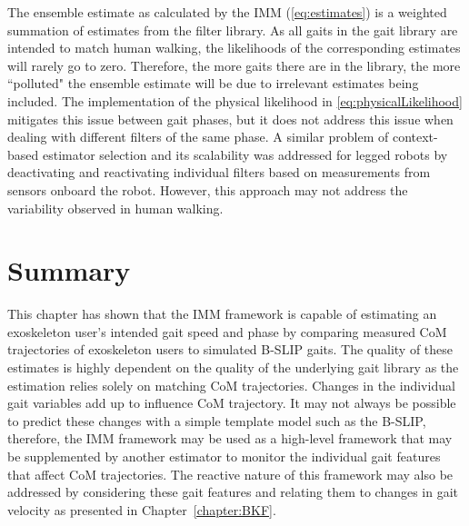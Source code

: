 The ensemble estimate as calculated by the IMM (\ref{eq:estimates}) is a weighted summation of estimates from the filter library. As all gaits in the gait library are intended to match human walking, the likelihoods of the corresponding estimates will rarely go to zero. Therefore, the more gaits there are in the library, the more ``polluted" the ensemble estimate will be due to irrelevant estimates being included. The implementation of the physical likelihood in \eqref{eq:physicalLikelihood} mitigates this issue between gait phases, but it does not address this issue when dealing with different filters of the same phase. A similar problem of context-based estimator selection and its scalability was addressed for legged robots by deactivating and reactivating individual filters \cite{skaff2010context} based on measurements from sensors onboard the robot. However, this approach may not address the variability observed in human walking.

\section{Summary}
This chapter has shown that the IMM framework is capable of estimating an exoskeleton user's intended gait speed and phase by comparing measured CoM trajectories of exoskeleton users to simulated B-SLIP gaits. The  quality of these estimates is highly dependent on the quality of the underlying gait library as the estimation relies solely on matching CoM trajectories. Changes in the individual gait variables add up to influence CoM trajectory. It may not always be possible to predict these changes with a simple template model such as the B-SLIP, therefore, the IMM framework may be used as a high-level framework that may be supplemented by another estimator to monitor the individual gait features that affect CoM trajectories. The reactive nature of this framework may also be addressed by considering these gait features and relating them to changes in gait velocity as presented in Chapter~\ref{chapter:BKF}.